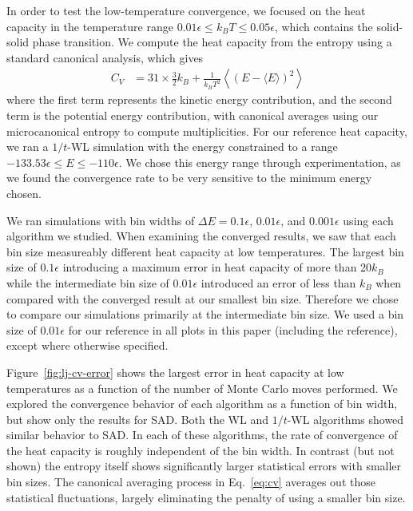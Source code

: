 \documentclass[letterpaper,twocolumn,amsmath,amssymb,pre,aps,10pt]{revtex4-1}
\begin{document}
In order to test the low-temperature convergence, we focused on the
heat capacity in the temperature range $0.01\epsilon \le k_BT \le
0.05\epsilon$, which contains the solid-solid phase transition.
%
We compute the heat capacity from the entropy using a standard
canonical analysis, which gives
\begin{align}
  C_V &= 31\times\frac32k_B + \frac1{k_BT^2}\left< (E- \langle
  E\rangle)^2\right>
  \label{eq:cv}
\end{align}
where the first term represents the kinetic energy contribution, and
the second term is the potential energy contribution, with canonical
averages using our microcanonical entropy to compute multiplicities.
%
For our reference heat capacity, we ran a $1/t$-WL simulation with the
energy constrained to a range $-133.53\epsilon\le E\le -110\epsilon$.
We chose this energy range through experimentation, as we found the
convergence rate to be very sensitive to the minimum energy chosen.

We ran simulations with bin widths of $\Delta E=0.1\epsilon$,
$0.01\epsilon$, and $0.001\epsilon$ using each algorithm we studied.
When examining the converged results, we saw that each bin size
measureably different heat capacity at low temperatures. The largest
bin size of $0.1\epsilon$ introducing a maximum error in heat capacity
of more than 20$k_B$ while the intermediate bin size of $0.01\epsilon$
introduced an error of less than $k_B$ when compared with the
converged result at our smallest bin size.  Therefore we chose to
compare our simulations primarily at the intermediate bin size.  We
used a bin size of $0.01\epsilon$ for our reference in all plots in
this paper (including the reference), except where otherwise
specified.

Figure~\ref{fig:lj-cv-error} shows the largest error in heat capacity
at low temperatures as a function of the number of Monte Carlo moves
performed.
%
We explored the convergence behavior of each algorithm as a function
of bin width, but show only the results for SAD.  Both the WL and
$1/t$-WL algorithms showed similar behavior to SAD.  In each of these
algorithms, the rate of convergence of the heat capacity is roughly
independent of the bin width.  In contrast (but not shown) the entropy
itself shows significantly larger statistical errors with smaller bin
sizes.  The canonical averaging process in Eq.~\ref{eq:cv} averages
out those statistical fluctuations, largely eliminating the penalty of
using a smaller bin size.
\end{document}
